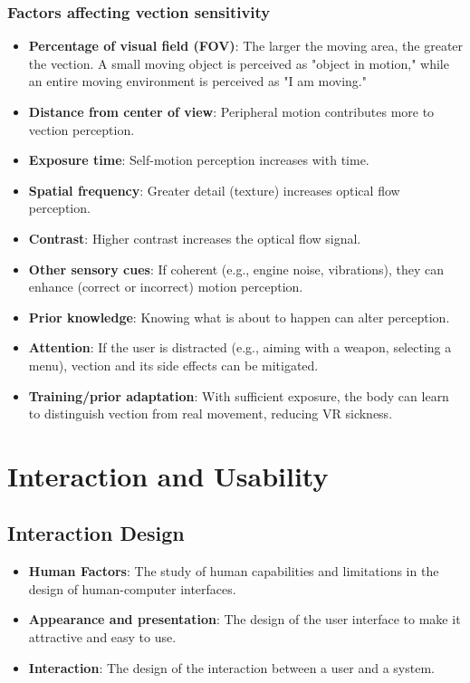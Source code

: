 \documentclass[11pt,a4paper]{article}
\theoremstyle{definition}
\theoremstyle{plain}
\theoremstyle{remark}
\begin{document}
\subsubsection{Factors affecting vection sensitivity}
\begin{itemize}
    \item \textbf{Percentage of visual field (FOV)}: The larger the moving area, the greater the vection. A small moving object is perceived as "object in motion," while an entire moving environment is perceived as "I am moving."
    
    \item \textbf{Distance from center of view}: Peripheral motion contributes more to vection perception.
    
    \item \textbf{Exposure time}: Self-motion perception increases with time.
    
    \item \textbf{Spatial frequency}: Greater detail (texture) increases optical flow perception.
    
    \item \textbf{Contrast}: Higher contrast increases the optical flow signal.
    
    \item \textbf{Other sensory cues}: If coherent (e.g., engine noise, vibrations), they can enhance (correct or incorrect) motion perception.
    
    \item \textbf{Prior knowledge}: Knowing what is about to happen can alter perception.
    
    \item \textbf{Attention}: If the user is distracted (e.g., aiming with a weapon, selecting a menu), vection and its side effects can be mitigated.
    
    \item \textbf{Training/prior adaptation}: With sufficient exposure, the body can learn to distinguish vection from real movement, reducing VR sickness.
\end{itemize}

\section{Interaction and Usability}

\subsection{Interaction Design}
\begin{itemize}
    \item \textbf{Human Factors}: The study of human capabilities and limitations in the 
    design of human-computer interfaces.
    \item \textbf{Appearance and presentation}: The design of the user interface to make it attractive and easy to use.
    \item \textbf{Interaction}: The design of the interaction between a user and a system.
\end{itemize}    
\end{document}
